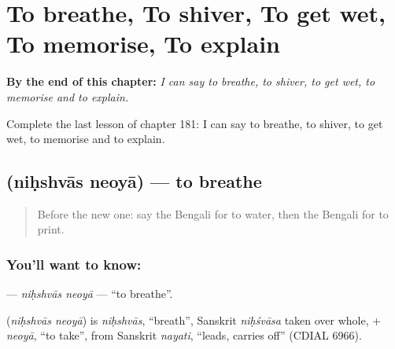 
\chapter{To breathe, To shiver, To get wet, To memorise, To explain}
\label{ch:bn-to-breathe-to-shiver-to-get-wet-to-memorise-to-explain}

\begin{chapteropening}
\textbf{By the end of this chapter:} \emph{I can say to breathe, to shiver, to get wet, to memorise and to explain.}

Complete the last lesson of chapter 181: I can say to breathe, to shiver, to get wet, to memorise and to explain.
\end{chapteropening}

\section[\texorpdfstring{\bn{নিঃশ্বাস} \bn{নেওয়া} (niḥshvās neoyā)}{নিঃশ্বাস নেওয়া (niḥshvās neoyā)}]{  (niḥshvās neoyā) — to breathe}

\label{lesson:BN-C181-nihshvas-neoya}



\begin{quote}
Before the new one: say the Bengali for to water, then the Bengali for to print.
\end{quote}

\subsection*{You'll want to know:  }
\textbf{ } — \emph{niḥshvās neoyā} — \textquotedblleft{}to breathe\textquotedblright{}.

\begin{cousinweb}
\textbf{ } (\emph{niḥshvās neoyā}) is \emph{niḥshvās}, \textquotedblleft{}breath\textquotedblright{}, Sanskrit \emph{niḥśvāsa} taken over whole, + \emph{neoyā}, \textquotedblleft{}to take\textquotedblright{}, from Sanskrit \emph{nayati}, \textquotedblleft{}leads, carries off\textquotedblright{} (CDIAL 6966).
\end{cousinweb}

